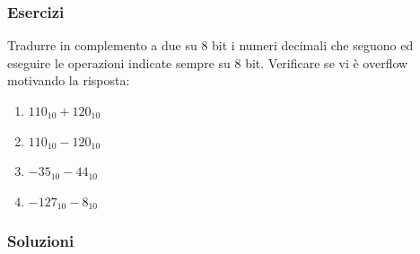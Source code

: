 \documentclass{article}
\begin{document}
\subsubsection*{Esercizi}
Tradurre in complemento a due su 8 bit i numeri decimali che seguono ed eseguire le operazioni indicate sempre su 8 bit. Verificare se vi \`e overflow motivando la risposta:

\begin{enumerate}
    \item $110_{10}+120_{10}$
    \item $110_{10}-120_{10}$
    \item $-35_{10}-44_{10}$
    \item $-127_{10}-8_{10}$
\end{enumerate}

\subsubsection*{Soluzioni}
\end{document}
